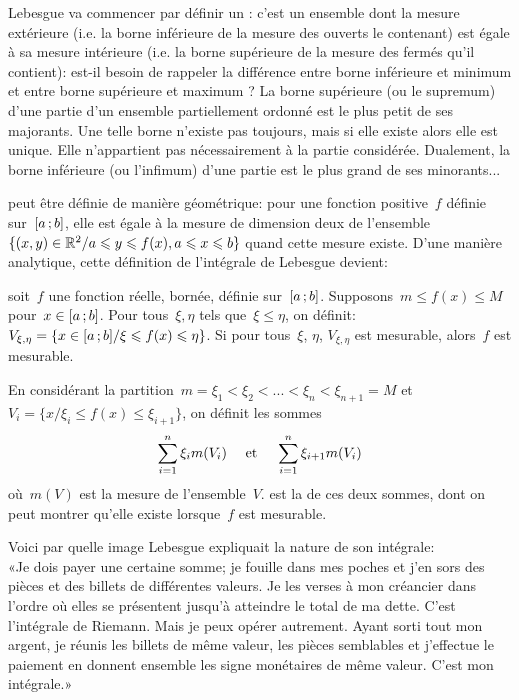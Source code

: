 \begin{histoire}
\medskip
Lebesgue va commencer par définir un : c'est un ensemble dont la mesure extérieure (i.e. la borne inférieure de la mesure des ouverts le contenant) est égale à sa mesure intérieure (i.e. la borne supérieure de la mesure des fermés qu'il contient): est-il besoin de rappeler la différence entre borne inférieure et minimum et entre borne supérieure et maximum ? La borne supérieure (ou le supremum) d'une partie d'un ensemble partiellement ordonné est le plus petit de ses majorants. Une telle borne n'existe pas toujours, mais si elle existe alors elle est unique. Elle n'appartient pas nécessairement à la partie considérée.
Dualement, la borne inférieure (ou l'infimum) d'une partie est le plus grand de ses minorants...

 peut être définie de manière géométrique: pour une fonction positive~$f$ définie sur~$\mathopen{[}a\,;b\mathclose{]}$, elle est égale à la mesure de dimension deux de l'ensemble $\{(x,y)\in\mathbb R^2 / a\leqslant y\leqslant f(x), a\leqslant x\leqslant b\}$ quand cette mesure existe.
D'une manière analytique, cette définition de l'intégrale de Lebesgue devient:

\begin{definition}
soit~$f$ une fonction réelle, bornée, définie sur~$\mathopen{[}a\,;b\mathclose{]}$.
Supposons~$m\le f(x)\le M$ pour~$x\in\mathopen{[}a\,;b\mathclose{]}$.
Pour tous~$\xi, \eta$ tels que~$\xi\le\eta$, on définit:
$V_{\xi,\eta}=\{x\in\mathopen{[}a\,;b\mathclose{]}/ \xi\leqslant f(x)\leqslant\eta\}$.
Si pour tous~$\xi$, $\eta$, $V_{\xi,\eta}$ est mesurable, alors~$f$ est mesurable.

En considérant la partition~$m=\xi_1<\xi_2<...<\xi_n<\xi_{n+1}=M$ et
$V_i=\{x/ \xi_i\le f(x)\le\xi_{i+1}\}$, on définit les sommes
\begin{equation} \displaystyle\sum_{i=1}^n\xi_i m(V_i) \quad \text{ et }\quad \displaystyle\sum_{i=1}^n\xi_{i+1} m(V_i) \end{equation}
où~$m(V)$ est la mesure de l'ensemble~$V$.
 est la  de ces deux sommes, dont on peut montrer qu'elle existe lorsque~$f$ est mesurable.
\end{definition}

Voici par quelle image Lebesgue expliquait la nature de son intégrale:\\
«Je dois payer une certaine somme; je fouille dans mes poches et j'en sors des pièces et des billets de différentes valeurs. Je les verses à mon créancier dans l'ordre où elles se présentent jusqu'à atteindre le total de ma dette. C'est l'intégrale de Riemann. Mais je peux opérer autrement. Ayant sorti tout mon argent, je réunis les billets de même valeur, les pièces semblables et j'effectue le paiement en donnent ensemble les signe monétaires de même valeur. C'est mon intégrale.»


\end{histoire}
